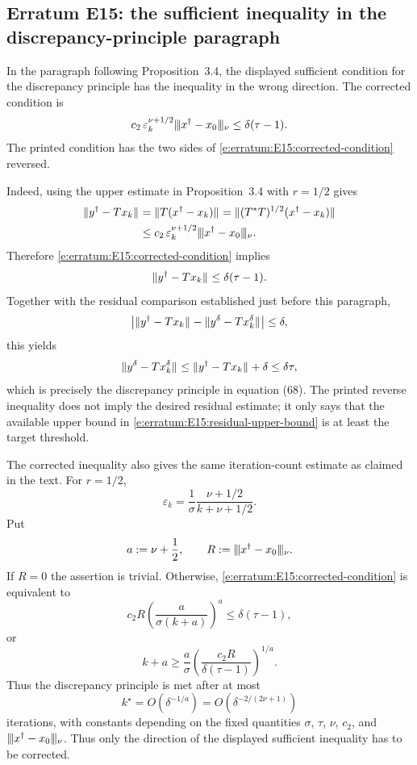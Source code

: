 
\subsection*{Erratum E15: the sufficient inequality in the discrepancy-principle paragraph}
\label{s:erratum:E15}

In the paragraph following Proposition~3.4, the displayed
sufficient condition for the discrepancy principle has the inequality in
the wrong direction.  The corrected condition is
\begin{align}
\label{e:erratum:E15:corrected-condition}
        c_2\,\varepsilon_k^{\nu+1/2}
        \vert\kern-0.25ex\vert\kern-0.25ex\vert x^\dag-x_0 \vert\kern-0.25ex \vert\kern-0.25ex\vert_{ \nu }
        \leq
        \delta(\tau-1).
\end{align}
The printed condition has the two sides of
\eqref{e:erratum:E15:corrected-condition} reversed.

Indeed, using the upper estimate in Proposition~3.4 with
$r=1/2$ gives
\begin{align}
\label{e:erratum:E15:residual-upper-bound}
        \| y^\dag-Tx_k \|_{  }
        & =
        \| T(x^\dag-x_k) \|_{  }
        =
        \| (T^*T)^{1/2}(x^\dag-x_k) \|_{  }
        \\
        & \leq
        c_2\,\varepsilon_k^{\nu+1/2}
        \vert\kern-0.25ex\vert\kern-0.25ex\vert x^\dag-x_0 \vert\kern-0.25ex \vert\kern-0.25ex\vert_{ \nu } .
\end{align}
Therefore \eqref{e:erratum:E15:corrected-condition} implies
\[
        \| y^\dag-Tx_k \|_{  }
        \leq
        \delta(\tau-1).
\]
Together with the residual comparison established just before this
paragraph,
\[
        \left|
        \| y^\dag-Tx_k \|_{  }
        -
        \| y^\delta-Tx_k^\delta \|_{  }
        \right|
        \leq
        \delta,
\]
this yields
\[
        \| y^\delta-Tx_k^\delta \|_{  }
        \leq
        \| y^\dag-Tx_k \|_{  }+
        \delta
        \leq
        \delta\tau,
\]
which is precisely the discrepancy principle in equation (68).  The printed
reverse inequality does not imply the desired residual estimate; it only
says that the available upper bound in
\eqref{e:erratum:E15:residual-upper-bound} is at least the target
threshold.

The corrected inequality also gives the same iteration-count estimate as
claimed in the text.  For $r=1/2$,
\[
        \varepsilon_k
        =
        \frac{1}{\sigma}
        \frac{\nu+1/2}{k+\nu+1/2} .
\]
Put
\[
        a:=\nu+\frac12,
        \qquad
        R:=\vert\kern-0.25ex\vert\kern-0.25ex\vert x^\dag-x_0 \vert\kern-0.25ex \vert\kern-0.25ex\vert_{ \nu } .
\]
If $R=0$ the assertion is trivial.  Otherwise,
\eqref{e:erratum:E15:corrected-condition} is equivalent to
\[
        c_2 R
        \left(
                \frac{a}{\sigma(k+a)}
        \right)^a
        \leq
        \delta(\tau-1),
\]
or
\[
        k+a
        \geq
        \frac{a}{\sigma}
        \left(
                \frac{c_2 R}{\delta(\tau-1)}
        \right)^{1/a} .
\]
Thus the discrepancy principle is met after at most
\[
        k^\star
        =
        O\!\left(\delta^{-1/a}\right)
        =
        O\!\left(\delta^{-2/(2\nu+1)}\right)
\]
iterations, with constants depending on the fixed quantities
$\sigma$, $\tau$, $\nu$, $c_2$, and
$\vert\kern-0.25ex\vert\kern-0.25ex\vert x^\dag-x_0 \vert\kern-0.25ex \vert\kern-0.25ex\vert_{ \nu }$.  Thus only the direction of the displayed
sufficient inequality has to be corrected.
